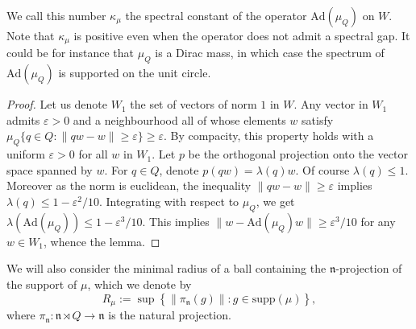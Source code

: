 \documentclass[11pt,leqno]{article}
\theoremstyle{plain}
\theoremstyle{definition}
\theoremstyle{remark}
\numberwithin{equation}{section}
\newcommand{\Ad}{\mathrm{Ad}}
\begin{document}
We call this number $\kappa_\mu$ the spectral constant of the operator $\Ad(\mu_Q)$ on $W$. Note that $\kappa_\mu$ is positive even when the operator does not admit a spectral gap. It could be for instance that $\mu_Q$ is a Dirac mass, in which case the spectrum of $\Ad(\mu_Q)$ is supported on the unit circle.

\begin{proof}
Let us denote $W_1$ the set of vectors of norm $1$ in $W$. Any vector in $W_1$ admits $\varepsilon>0$ and a neighbourhood all of whose elements $w$ satisfy $\mu_Q\{q \in Q: \|qw-w\|\ge \varepsilon\}\ge \varepsilon$. By compacity, this property holds with a uniform $\varepsilon>0$ for all $w$ in $W_1$. Let $p$ be the orthogonal projection onto the vector space spanned by $w$. For $q \in Q$, denote $p(qw)=\lambda(q)w$. Of course $\lambda(q)\le 1$. Moreover as the norm is euclidean, the inequality $\|qw-w\|\ge \varepsilon$ implies $\lambda(q) \le 1-\varepsilon^2/10$. Integrating with respect to $\mu_Q$, we get $\lambda(\Ad(\mu_Q))\le 1-\varepsilon^3/10$. This implies $\|w-\Ad(\mu_Q)w\|\ge \varepsilon^3/10$ for any $w \in W_1$, whence the lemma.
\end{proof}




We will also consider the minimal radius of a ball containing the $\mathfrak{n}$-projection of the support of $\mu$, which we denote by
\[
R_\mu:=\sup\left\{\|\pi_{\mathfrak{n}}(g)\|:g \in \mathrm{supp}(\mu)\right\},
\]
where $\pi_{\mathfrak{n}}:\mathfrak{n}\rtimes Q \to \mathfrak{n}$ is the natural projection.

\end{document}
